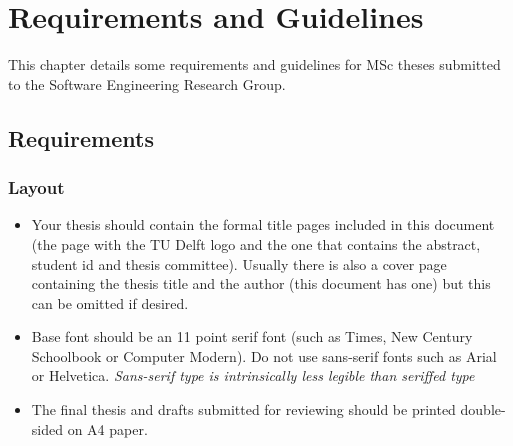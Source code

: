 
\chapter{Requirements and Guidelines}

This chapter details some requirements and guidelines for MSc theses
submitted to the Software Engineering Research Group.


\section{Requirements}


\subsection{Layout}
\begin{itemize}
\item Your thesis should contain the formal title pages included in this
document (the page with the TU Delft logo and the one that contains
the abstract, student id and thesis committee). Usually there is also
a cover page containing the thesis title and the author (this document
has one) but this can be omitted if desired.
\item Base font should be an 11 point serif font (such as Times, New Century
Schoolbook or Computer Modern). Do not use sans-serif fonts such as
Arial or Helvetica. \textsl{Sans-serif type is intrinsically less
legible than seriffed type}
\item The final thesis and drafts submitted for reviewing should be printed
double-sided on A4 paper. 
\end{itemize}

